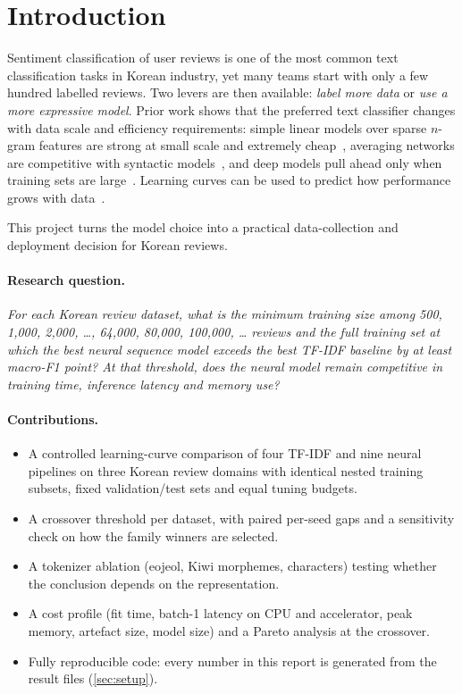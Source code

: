 \section{Introduction}
\label{sec:intro}

Sentiment classification of user reviews is one of the most common text
classification tasks in Korean industry, yet many teams start with only a few
hundred labelled reviews. Two levers are then available: \emph{label more data} or
\emph{use a more expressive model}. Prior work shows that the preferred text
classifier changes with data scale and efficiency requirements: simple linear
models over sparse $n$-gram features are strong at small scale and extremely
cheap~\cite{joulin2017bag}, averaging networks are competitive with syntactic
models~\cite{iyyer2015deep}, and deep models pull ahead only when training sets
are large~\cite{zhang2015character}. Learning curves can be used to predict how
performance grows with data~\cite{kolachina2012prediction}.

This project turns the model choice into a practical data-collection and
deployment decision for Korean reviews.

\paragraph{Research question.}
\emph{For each Korean review dataset, what is the minimum training size among
500, 1{,}000, 2{,}000, \dots, 64{,}000, 80{,}000, 100{,}000, \dots{} reviews and the full training set at which the best neural sequence
model exceeds the best TF-IDF baseline by at least \crossoverMargin{} macro-F1
point? At that threshold, does the neural model remain competitive in training
time, inference latency and memory use?}

\paragraph{Contributions.}
\begin{itemize}
  \item A controlled learning-curve comparison of four TF-IDF and nine neural
        pipelines on three Korean review domains with identical nested training
        subsets, fixed validation/test sets and equal tuning budgets.
  \item A crossover threshold per dataset, with paired per-seed gaps and a
        sensitivity check on how the family winners are selected.
  \item A tokenizer ablation (eojeol, Kiwi morphemes, characters) testing whether the
        conclusion depends on the representation.
  \item A cost profile (fit time, batch-1 latency on CPU and accelerator, peak memory,
        artefact size, model size) and a Pareto analysis at the crossover.
  \item Fully reproducible code: every number in this report is generated from
        the result files (\cref{sec:setup}).
\end{itemize}
